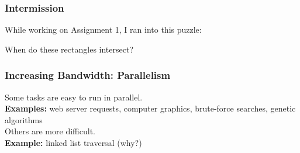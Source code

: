 \documentclass[aspectratio=43]{beamer}
\begin{document}
\begin{frame}
  \frametitle{Intermission}

  While working on Assignment 1, I ran into this puzzle:

  \vspace*{1cm}\hspace*{1cm}

  When do these rectangles intersect?
\end{frame}


\begin{frame}
  \frametitle{Increasing Bandwidth: Parallelism}

\hspace*{.2\textwidth}\begin{minipage}{.76\textwidth}
   Some tasks are easy to run in parallel. \\[1em]
   {\bf \hspace*{3em} Examples:} web server requests, computer graphics, brute-force searches,  genetic
          algorithms\\[2em]
 Others are more difficult.\\[1em]
    {\bf \hspace*{3em} Example:} linked list traversal (why?)
\end{minipage}

\end{frame}
\end{document}
